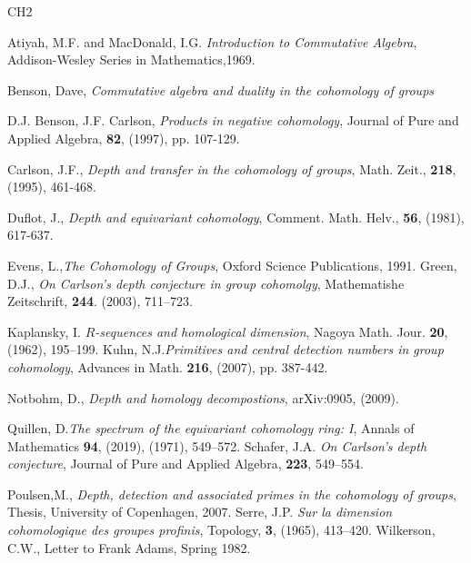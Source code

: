 \documentclass[reqno]{amsart}
\theoremstyle{plain}%
\theoremstyle{definition}
\theoremstyle{remark}
\begin{document}
\begin{thebibliography}{CH2}

 Atiyah, M.F. and MacDonald, I.G. \emph{Introduction to Commutative Algebra}, Addison-Wesley Series in Mathematics,1969.
 
 Benson, Dave, \emph{Commutative algebra and duality in the cohomology of groups}
 
 D.J. Benson, J.F. Carlson, \emph{Products in negative cohomology}, Journal of Pure and Applied Algebra, \textbf{82}, (1997), pp. 107-129.
 
 Carlson, J.F., \emph{Depth and transfer in the cohomology of groups}, Math. Zeit., \textbf{218}, (1995), 461-468.
 
 Duflot, J., \emph{Depth and equivariant cohomology}, Comment. Math. Helv., \textbf{56}, (1981), 617-637.
 
 Evens, L.,\emph{The Cohomology of Groups}, Oxford Science Publications, 1991.
 Green, D.J., \emph{On Carlson's depth conjecture in group cohomolgy}, Mathematishe Zeitschrift, \textbf{244}. (2003), 711--723.
 
 Kaplansky, I. \emph{$R$-sequences and homological dimension}, Nagoya Math. Jour. \textbf{20},(1962), 195--199.
 Kuhn, N.J.\emph{Primitives and central detection numbers in group cohomology}, Advances in Math. \textbf{216}, (2007), pp. 387-442.
 
 Notbohm, D., \emph{Depth and homology decompostions}, arXiv:0905, (2009).
 
 Quillen, D.\emph{The spectrum of the equivariant cohomology ring: I}, Annals of Mathematics \textbf{94}, (2019), (1971), 549--572.
 Schafer, J.A. \emph{On Carlson's depth conjecture}, Journal of Pure and Applied Algebra, \textbf{223},  549--554.
 
 Poulsen,M., \emph{Depth, detection and associated primes in the cohomology of groups}, Thesis, University of Copenhagen, 2007.
 Serre, J.P. \emph{Sur la dimension cohomologique des groupes profinis}, Topology, \textbf{3}, (1965), 413--420.
 Wilkerson, C.W., Letter to Frank Adams, Spring 1982.

\end{thebibliography}
\end{document}
